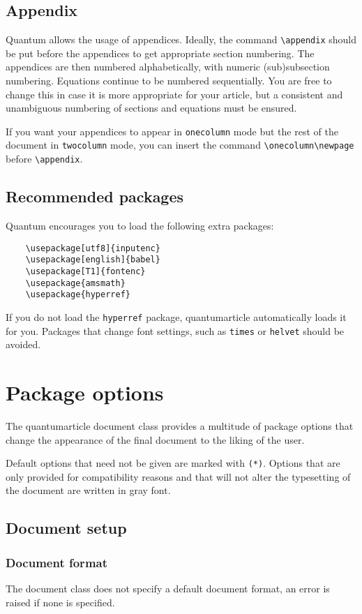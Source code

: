 \documentclass[a4paper,noarxiv,onecolumn]{quantumarticle}
\begin{document}
	\subsection{Appendix}
	Quantum allows the usage of appendices. Ideally, the command \texttt{\textbackslash{}appendix} should be put before the appendices to get appropriate section numbering. The appendices are then numbered alphabetically, with numeric (sub)subsection numbering.
	Equations continue to be numbered sequentially.
	You are free to change this in case it is more appropriate for your article, but a consistent and unambiguous numbering of sections and equations must be ensured.
	
	If you want your appendices to appear in \texttt{onecolumn} mode but the rest of the document in \texttt{twocolumn} mode, you can insert the command \texttt{\textbackslash{}onecolumn\textbackslash{}newpage} before \texttt{\textbackslash{}appendix}.   
	
	\subsection{Recommended packages}
	Quantum encourages you to load the following extra packages:
	\begin{verbatim}
	\usepackage[utf8]{inputenc}
	\usepackage[english]{babel}
	\usepackage[T1]{fontenc}
	\usepackage{amsmath}
	\usepackage{hyperref}
	\end{verbatim}
	If you do not load the \texttt{hyperref} package, quantumarticle automatically loads it for you.
	Packages that change font settings, such as \texttt{times} or \texttt{helvet} should be avoided.
	
	\section{Package options}
	The quantumarticle document class provides a multitude of package options that change the appearance of the final document to the liking of the user. 
	
	Default options that need not be given are marked with \texttt{(*)}. Options that are only provided for compatibility reasons and that will not alter the typesetting of the document are written in gray font.
	
	\subsection{Document setup}
	
	\subsubsection{Document format}
	The document class does not specify a default document format, an error is raised if none is specified.
	
\end{document}
